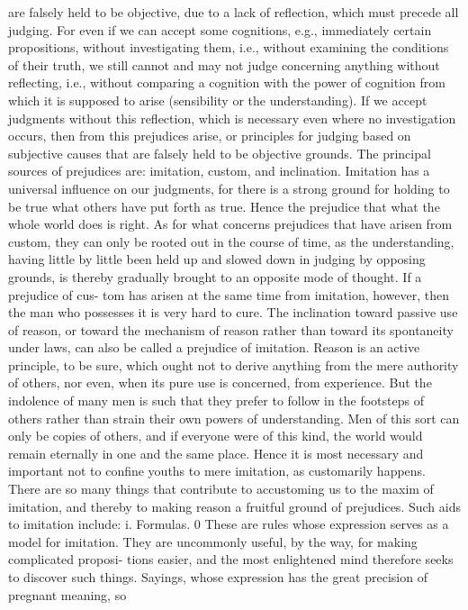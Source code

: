 are falsely held to be objective, due to a lack of reflection, which must
precede all judging. For even if we can accept some cognitions, e.g.,
immediately certain propositions, without investigating them, i.e., without
examining the conditions of their truth, we still cannot and may not judge
concerning anything without reflecting, i.e., without comparing a cognition
with the power of cognition from which it is supposed to arise (sensibility
or the understanding). If we accept judgments without this reflection,
which is necessary even where no investigation occurs, then from this
prejudices arise, or principles for judging based on subjective causes that
are falsely held to be objective grounds.
The principal sources of prejudices are: imitation, custom, and inclination.
Imitation has a universal influence on our judgments, for there is a
strong ground for holding to be true what others have put forth as true.
Hence the prejudice that what the whole world does is right. As for what
concerns prejudices that have arisen from custom, they can only be rooted
out in the course of time, as the understanding, having little by little been
held up and slowed down in judging by opposing grounds, is thereby
gradually brought to an opposite mode of thought. If a prejudice of cus-
tom has arisen at the same time from imitation, however, then the man
who possesses it is very hard to cure. The inclination toward passive use of
reason, or toward the mechanism of reason rather than toward its spontaneity
under laws, can also be called a prejudice of imitation.
Reason is an active principle, to be sure, which ought not to derive
anything from the mere authority of others, nor even, when its pure use is
concerned, from experience. But the indolence of many men is such that
they prefer to follow in the footsteps of others rather than strain their own
powers of understanding. Men of this sort can only be copies of others,
and if everyone were of this kind, the world would remain eternally in one
and the same place. Hence it is most necessary and important not to
confine youths to mere imitation, as customarily happens.
There are so many things that contribute to accustoming us to the
maxim of imitation, and thereby to making reason a fruitful ground of
prejudices. Such aids to imitation include:
i. Formulas. 0 These are rules whose expression serves as a model for imitation.
They are uncommonly useful, by the way, for making complicated proposi-
tions easier, and the most enlightened mind therefore seeks to discover such
things.
Sayings, whose expression has the great precision of pregnant meaning, so
